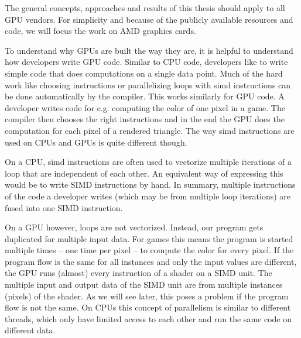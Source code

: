 The general concepts, approaches and results of this thesis should apply to all GPU vendors. For simplicity and because of the publicly available resources and code, we will focus the work on AMD graphics cards.

To understand why GPUs are built the way they are, it is helpful to understand how developers write GPU code. Similar to CPU code, developers like to write simple code that does computations on a single data point. Much of the hard work like choosing instructions or parallelizing loops with \gls{simd} instructions can be done automatically by the compiler. This works similarly for GPU code. A developer writes code for e.g. computing the color of one pixel in a game. The compiler then chooses the right instructions and in the end the GPU does the computation for each pixel of a rendered triangle. The way \gls{simd} instructions are used on CPUs and GPUs is quite different though.

On a CPU, \gls{simd} instructions are often used to vectorize multiple iterations of a loop that are independent of each other. An equivalent way of expressing this would be to write SIMD instructions by hand. In summary, multiple instructions of the code a developer writes (which may be from multiple loop iterations) are fused into one SIMD instruction.

On a GPU however, loops are not vectorized. Instead, our program gets duplicated for multiple input data. For games this means the program is started multiple times -- one time per pixel -- to compute the color for every pixel. If the program flow is the same for all instances and only the input values are different, the GPU runs (almost) every instruction of a shader on a SIMD unit. The multiple input and output data of the SIMD unit are from multiple instances (pixels) of the shader. As we will see later, this poses a problem if the program flow is not the same. On CPUs this concept of parallelism is similar to different threads, which only have limited access to each other and run the same code on different data.

